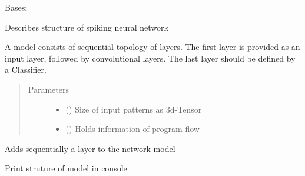 \documentclass[letterpaper,10pt,english]{sphinxmanual}
\begin{document}
\begin{fulllineitems}
\label{\detokenize{SpikingConvNet:SpikingConvNet.classes.SpikingModel}}
Bases: 

Describes structure of spiking neural network

A model consists of sequential topology of layers. The first layer is
provided as an input layer, followed by convolutional layers. The last
layer should be defined by a Classifier.
\begin{quote}\begin{description}
\item[{Parameters}] \leavevmode\begin{itemize}
\item {} 
 () \textendash{} Size of input patterns as 3d-Tensor

\item {} 
 () \textendash{} Holds information of program flow

\end{itemize}

\end{description}\end{quote}

\begin{fulllineitems}
\label{\detokenize{SpikingConvNet:SpikingConvNet.classes.SpikingModel.add}}
Adds sequentially a layer to the network model

\end{fulllineitems}


\begin{fulllineitems}
\label{\detokenize{SpikingConvNet:SpikingConvNet.classes.SpikingModel.print_structure}}
Print struture of model in console

\end{fulllineitems}


\end{fulllineitems}
\end{document}
